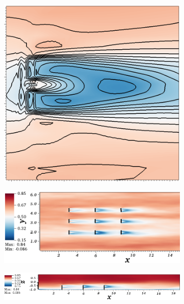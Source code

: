 \begin{figure}
\centering
        \begin{subfigure}[t]{0.35\textwidth}
                \includegraphics[width=\linewidth]{Figure/avg_lines.png}
                \caption{}
                \label{fig:ss1}
        \end{subfigure}%
        \centering
        \begin{subfigure}[t]{0.55\textwidth}
                \includegraphics[width=\linewidth]{Figure/avg_2.png}
                \caption{}
                \label{fig:ss2}
        \end{subfigure}
        \centering
        \begin{subfigure}[t]{0.75\textwidth}
                \includegraphics[width=\linewidth]{Figure/avg_3.png}

\end{subfigure}
\end{figure}
